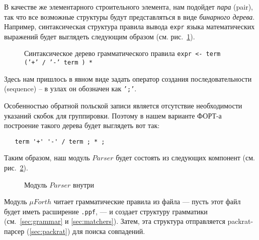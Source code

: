 \documentclass[10pt]{report}
\begin{document}
В качестве же элементарного строительного элемента, нам подойдет {\em пара} (pair), так что все возможные структуры будут представляться в виде {\em бинарного дерева}.
Например, синтаксическая структура правила вывода \texttt{expr} языка математических выражений будет выглядеть следующим образом (см. рис.~\ref{binary-grammar}).
\begin{figure}[b]
\begin{center}
	\end{center}
\caption{Синтаксическое дерево грамматического правила \texttt{expr <- term ('+' / '-' term ) *}}
\label{binary-grammar}
\end{figure}
Здесь нам пришлось в явном виде задать оператор создания последовательности (sequence) -- в узлах он обозначен как \texttt{';'}.

Особенностью обратной польской записи является отсутствие необходимости указаний скобок для группировки.
Поэтому в нашем варианте ФОРТ-а построение такого дерева будет выглядеть вот так:
\begin{verbatim}
   term '+' '-' / term ; * ;
\end{verbatim}

Таким образом, наш модуль $\boxed{Parser}$ будет состоять из следующих компонент (см. рис.~\ref{fig:parser}).
\begin{figure}[b]
\begin{center}
\caption{Модуль $\boxed{Parser}$ внутри}
\label{fig:parser}
\end{center}
\end{figure}
Модуль $\boxed{\mu Forth}$ читает грамматические правила из файла --- пусть этот файл будет иметь расширение {\tt .ppf}, --- и создает структуру грамматики (см.~\ref{sec:grammar} и \ref{sec:matchers}).
Затем, эта структура отправляется packrat-парсер (\ref{sec:packrat}) для поиска совпадений.
\end{document}
